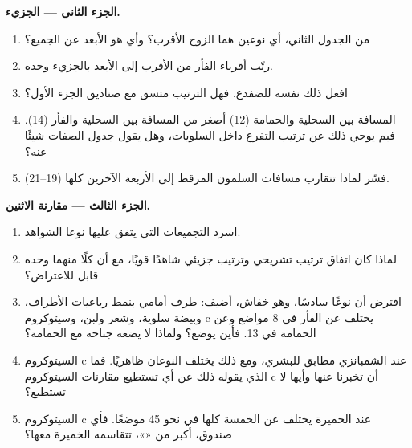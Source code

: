 \begin{problem}
\medskip
\noindent\textbf{الجزء الثاني --- الجزيء.}
\begin{enumerate}[resume]
  \item من الجدول الثاني، أي نوعين هما الزوج الأقرب؟ وأي  هو الأبعد
        عن الجميع؟
  \item رتّب أقرباء الفأر من الأقرب إلى الأبعد بالجزيء وحده.
  \item افعل ذلك نفسه للضفدع. فهل الترتيب متسق مع صناديق الجزء الأول؟
  \item المسافة بين السحلية والحمامة (12) أصغر من المسافة بين السحلية
        والفأر (14). فبم يوحي ذلك عن ترتيب التفرع داخل السلويات، وهل
        يقول جدول الصفات شيئًا عنه؟
  \item فسّر لماذا تتقارب مسافات السلمون المرقط إلى الأربعة الآخرين
        كلها (19--21).
\end{enumerate}

\medskip
\noindent\textbf{الجزء الثالث --- مقارنة الاثنين.}
\begin{enumerate}[resume]
  \item اسرد التجميعات التي يتفق عليها نوعا الشواهد.
  \item لماذا كان اتفاق ترتيب تشريحي وترتيب جزيئي شاهدًا قويًا، مع أن
        كلًا منهما وحده قابل للاعتراض؟
  \item افترض أن نوعًا سادسًا، وهو خفاش، أضيف: طرف أمامي بنمط رباعيات
        الأطراف، وبيضة سلوية، وشعر ولبن، وسيتوكروم c يختلف عن الفأر
        في 8 مواضع وعن الحمامة في 13. فأين يوضع؟ ولماذا لا يضعه
        جناحه مع الحمامة؟
  \item السيتوكروم c عند الشمبانزي مطابق للبشري، ومع ذلك يختلف النوعان
        ظاهريًا. فما الذي يقوله ذلك عن أي  تستطيع مقارنات
        السيتوكروم c أن تخبرنا عنها وأيها لا تستطيع؟
  \item السيتوكروم c عند الخميرة يختلف عن الخمسة كلها في نحو 45
        موضعًا. فأي صندوق، أكبر من «»، تتقاسمه الخميرة معها؟
\end{enumerate}


\end{problem}
